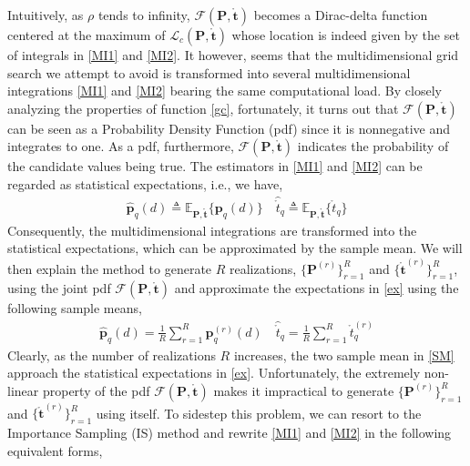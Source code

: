 \documentclass[review]{elsarticle}
\begin{document}
Intuitively, as $\rho$ tends to infinity, $\mathcal{F}(\boldsymbol{P},\mathring{\boldsymbol{t}})$ becomes a Dirac-delta function centered at the maximum of $\mathcal{L}_c(\boldsymbol{P},\mathring{\boldsymbol{t}})$ whose location is indeed given by the set of integrals in \eqref{MI1} and \eqref{MI2}. It however, seems that the multidimensional grid search we attempt to avoid is transformed into several multidimensional integrations \eqref{MI1} and \eqref{MI2} bearing the same computational load. By closely analyzing the properties of function \eqref{gc}, fortunately, it turns out that $\mathcal{F}(\boldsymbol{P},\mathring{\boldsymbol{t}})$ can be seen as a Probability Density Function (pdf) since it is nonnegative and integrates to one. As a pdf, furthermore, $\mathcal{F}(\boldsymbol{P},\mathring{\boldsymbol{t}})$ indicates the probability of the candidate values being true. The estimators in \eqref{MI1} and \eqref{MI2} can be regarded as statistical expectations, i.e., we have,
\begin{align}\label{ex}
    \hat{\boldsymbol{p}}_q(d)\triangleq \mathbb{E}_{\boldsymbol{P},\mathring{\boldsymbol{t}}}\{\boldsymbol{p}_q(d)\} \quad \hat{\mathring{t}}_q\triangleq \mathbb{E}_{\boldsymbol{P},\mathring{\boldsymbol{t}}}\{\mathring{t}_q\}
\end{align}
Consequently, the multidimensional integrations are transformed into the statistical expectations, which can be approximated by the sample mean. 
We will then explain the method to generate $R$ realizations, $\lbrace \boldsymbol{P}^{(r)}\rbrace_{r=1}^R$ and $\lbrace \mathring{\boldsymbol{t}}^{(r)}\rbrace_{r=1}^R$, using the joint pdf $\mathcal{F}(\boldsymbol{P},\mathring{\boldsymbol{t}})$ and approximate the expectations in \eqref{ex} using the following sample means,
\begin{align}\label{SM}
    \hat{\boldsymbol{p}}_q(d)=\frac{1}{R}\sum_{r=1}^R \boldsymbol{p}_q^{(r)}(d) \quad \hat{\mathring{t}}_q=\frac{1}{R}\sum_{r=1}^R \mathring{t}_q^{(r)}
\end{align}
Clearly, as the number of realizations $R$ increases, the two sample mean in \eqref{SM} approach the statistical expectations in \eqref{ex}. Unfortunately, the extremely non-linear property of the pdf $\mathcal{F}(\boldsymbol{P},\mathring{\boldsymbol{t}})$ makes it impractical to generate $\lbrace \boldsymbol{P}^{(r)}\rbrace_{r=1}^R$ and $\lbrace \mathring{\boldsymbol{t}}^{(r)}\rbrace_{r=1}^R$ using itself. To sidestep this problem, we can resort to the Importance Sampling (IS) method \cite{ISdoa2008,Kay2000Mean} and rewrite \eqref{MI1} and \eqref{MI2} in the following equivalent forms,
\end{document}
